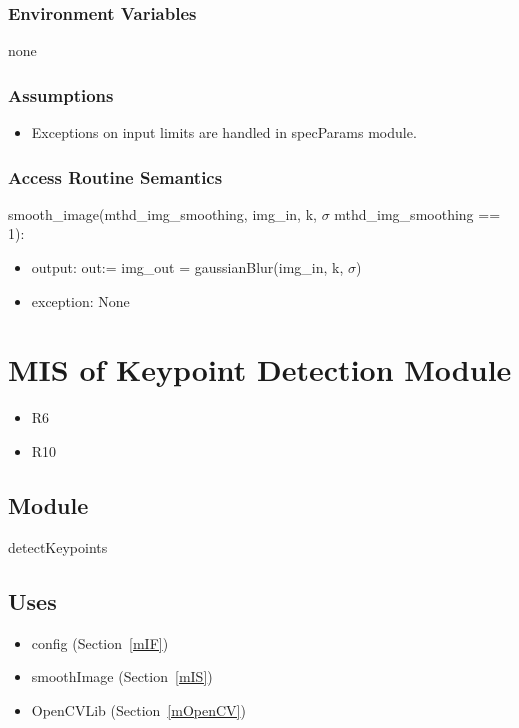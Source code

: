\documentclass[12pt, titlepage]{article}
\begin{document}
\subsubsection{Environment Variables}
none

\subsubsection{Assumptions}
  \begin{itemize}
  \item Exceptions on input limits are handled in specParams module.
  \end{itemize}

\subsubsection{Access Routine Semantics}

\noindent smooth\_image(mthd\_img\_smoothing, img\_in, 
k, $\sigma$ \textbar \: mthd\_img\_smoothing == 1):
\begin{itemize}
\item output: out:= img\_out = gaussianBlur(img\_in, 
  k, $\sigma$)
\item exception: None
\end{itemize}




\section{MIS of Keypoint Detection Module} \label{mKD}
\begin{itemize}
  \item R6
  \item R10
\end{itemize}

\subsection{Module}
detectKeypoints

\subsection{Uses}
\begin{itemize}
  \item config (Section~\ref{mIF})
  \item smoothImage (Section~\ref{mIS}) %
  \item OpenCVLib (Section~\ref{mOpenCV})
\end{itemize}
\end{document}
